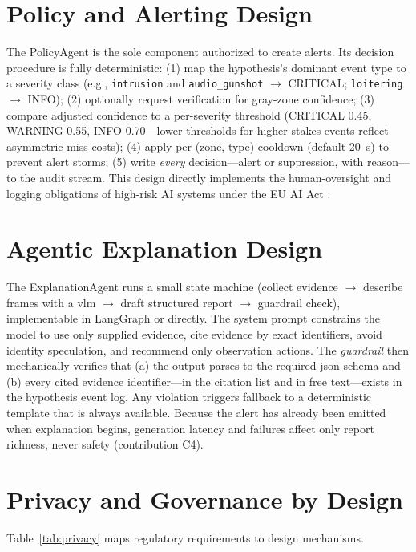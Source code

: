 \section{Policy and Alerting Design}

The PolicyAgent is the sole component authorized to create alerts. Its decision procedure is fully deterministic: (1) map the hypothesis's dominant event type to a severity class (e.g., \texttt{intrusion} and \texttt{audio\_gunshot} $\rightarrow$ CRITICAL; \texttt{loitering} $\rightarrow$ INFO); (2) optionally request verification for gray-zone confidence; (3) compare adjusted confidence to a per-severity threshold (CRITICAL 0.45, WARNING 0.55, INFO 0.70---lower thresholds for higher-stakes events reflect asymmetric miss costs); (4) apply per-(zone, type) cooldown (default 20~s) to prevent alert storms; (5) write \emph{every} decision---alert or suppression, with reason---to the audit stream. This design directly implements the human-oversight and logging obligations of high-risk AI systems under the EU AI Act \cite{euaiact2024}.

\section{Agentic Explanation Design}

The ExplanationAgent runs a small state machine (collect evidence $\rightarrow$ describe frames with a \gls{vlm} $\rightarrow$ draft structured report $\rightarrow$ guardrail check), implementable in LangGraph \cite{langgraph2024} or directly. The system prompt constrains the model to use only supplied evidence, cite evidence by exact identifiers, avoid identity speculation, and recommend only observation actions. The \emph{guardrail} then mechanically verifies that (a) the output parses to the required \gls{json} schema and (b) every cited evidence identifier---in the citation list and in free text---exists in the hypothesis event log. Any violation triggers fallback to a deterministic template that is always available. Because the alert has already been emitted when explanation begins, generation latency and failures affect only report richness, never safety (contribution C4).

\section{Privacy and Governance by Design}

Table~\ref{tab:privacy} maps regulatory requirements to design mechanisms.

